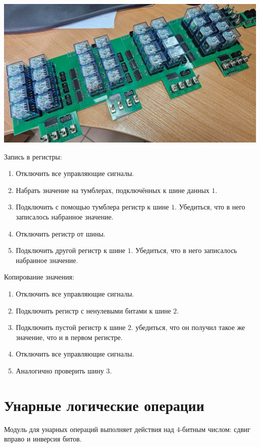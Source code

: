 \documentclass{book}
\begin{document}
\includegraphics[width=\columnwidth]{photo/register_file.jpg}

Запись в регистры:

\begin{enumerate}
    \item Отключить все управляющие сигналы.
    \item Набрать значение на тумблерах, подключённых к шине данных $1$.
    \item Подключить с помощью тумблера регистр к шине $1$. Убедиться, что в него записалось набранное значение.
    \item Отключить регистр от шины.
    \item Подключить другой регистр к шине $1$. Убедиться, что в него записалось набранное значение.
\end{enumerate}

Копирование значения:

\begin{enumerate}
    \item Отключить все управляющие сигналы.
    \item Подключить регистр с ненулевыми битами к шине $2$.
    \item Подключить пустой регистр к шине $2$. убедиться, что он получил такое же значение, что и в первом регистре.
    \item Отключить все управляющие сигналы.
    \item Аналогично проверить шину $3$.
\end{enumerate}


\section{Унарные логические операции}

Модуль для унарных операций выполняет действия над $4$-битным числом: сдвиг вправо и инверсия битов.
\end{document}

